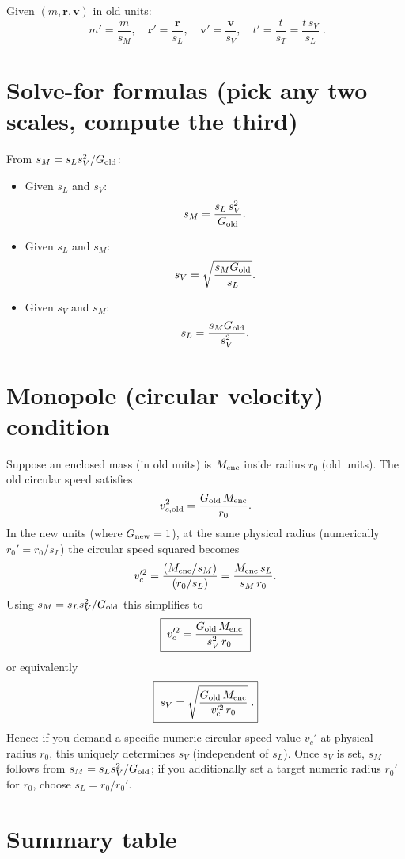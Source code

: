 \documentclass[11pt]{article}
\begin{document}
Given \((m,\mathbf{r},\mathbf{v})\) in old units:
\[\boxed{ \; m'=\frac{m}{s_M},\quad \mathbf{r}'=\frac{\mathbf{r}}{s_L},\quad \mathbf{v}'=\frac{\mathbf{v}}{s_V},\quad t'=\frac{t}{s_T}=\frac{t\,s_V}{s_L}\; }.\]

\section{Solve-for formulas (pick any two scales, compute the third)}

From \(s_M = s_L s_V^2 / G_{\rm old}\):
\begin{itemize}
\item Given \(s_L\) and \(s_V\):
  \[s_M = \frac{s_L\,s_V^2}{G_{\rm old}}.\]
\item Given \(s_L\) and \(s_M\):
  \[s_V = \sqrt{\frac{s_M G_{\rm old}}{s_L}}.\]
\item Given \(s_V\) and \(s_M\):
\[s_L = \frac{s_M G_{\rm old}}{s_V^2}.\]
\end{itemize}
\section{Monopole (circular velocity) condition}

Suppose an enclosed mass (in old units) is \(M_{\rm enc}\) inside
radius \(r_0\) (old units). The old circular speed satisfies
\[
  v_{c,{\rm old}}^2=\frac{G_{\rm old}\,M_{\rm enc}}{r_0}.
\]
In the new units (where \(G_{\rm new}=1\)), at the same physical
radius (numerically \(r_0' = r_0/s_L\)) the circular speed squared
becomes
\[
  v_c'^2 = \frac{(M_{\rm enc}/s_M)}{(r_0/s_L)} = \frac{M_{\rm
      enc}\,s_L}{s_M\,r_0}.
\]
Using \(s_M=s_L s_V^2/G_{\rm old}\) this simplifies to
\[
  \boxed{ \; v_c'^2 = \frac{G_{\rm old}\,M_{\rm enc}}{s_V^2\,r_0} \; }
\]
or equivalently
\[
  \boxed{ \; s_V = \sqrt{\frac{G_{\rm old}\,M_{\rm enc}}{v_c'^2\,r_0}}\;. }
\]
Hence: if you demand a specific numeric circular speed value \(v_c'\)
at physical radius \(r_0\), this uniquely determines \(s_V\)
(independent of \(s_L\)). Once \(s_V\) is set, \(s_M\) follows from
\(s_M=s_L s_V^2/G_{\rm old}\); if you additionally set a target
numeric radius \(r_0'\) for \(r_0\), choose \(s_L = r_0/r_0'\).

\section{Summary table}
\end{document}
